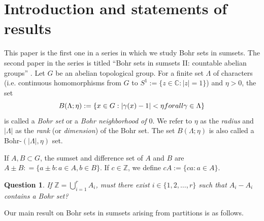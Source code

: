 \documentclass[10pt]{article}
\newtheorem{question}[question]{Question}
\theoremstyle{definition}
\newcommand{\C}{\mathbb{C}}
\newcommand{\Z}{\mathbb{Z}}
\begin{document}
\section{Introduction and statements of results}







This paper is the first one in a series in which we study Bohr sets in sumsets. The second paper in the series is titled ``Bohr sets in sumsets II: countable abelian groups'' \cite{Griesmer-Le-Le-countable}.
Let $G$ be an abelian topological group. For a finite set $\Lambda$ of characters (i.e. continuous homomorphisms from $G$ to $S^1 := \{ z \in \C: |z|=1\}$) and $\eta > 0$, the set 
\begin{equation*} \label{eq:bohr1}
B(\Lambda; \eta) := \{ x \in G : | \gamma(x)-1 | < \eta \textup{ for all } \gamma \in \Lambda\}
\end{equation*} 
is called a \textit{Bohr set} or a \emph{Bohr neighborhood of $0$}. We refer to $\eta$ as the \textit{radius} and $|\Lambda|$ as the \textit{rank} (or \textit{dimension}) of the Bohr set. The set $B(\Lambda; \eta)$ is also called a Bohr-$(|\Lambda|, \eta)$ set. 

If $A, B \subset G$, the sumset and difference set of $A$ and $B$ are $A\pm B: = \{a\pm b: a \in A, b \in B \}$. If $c \in \Z$, we define $cA:=\{ ca: a \in A\}$.
\setcounter{theorem}{2}
\begin{question} \label{q:kr}
If $\Z = \bigcup_{i=1}^r A_i$, must there exist $i \in \{1, 2, \ldots, r\}$ such that $A_i - A_i$ contains a Bohr set?
\end{question}
\setcounter{theorem}{4}
Our main result on Bohr sets in sumsets arising from partitions is as follows. 

\end{document}
